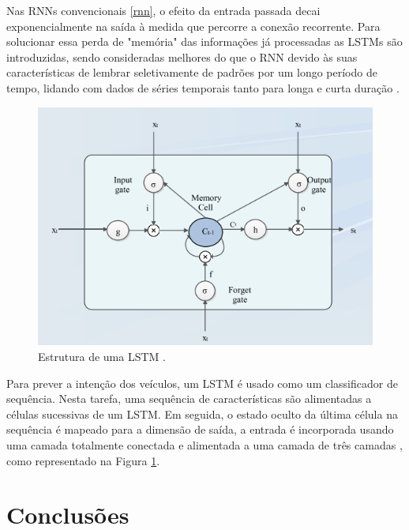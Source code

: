  \label{LSTM-s}

Nas RNNs convencionais \ref{rnn}, o efeito da entrada passada decai exponencialmente na saída à medida que percorre a conexão recorrente. Para solucionar essa perda de "memória" das informações já processadas as LSTMs são introduzidas, sendo consideradas melhores do que o RNN devido às suas características de lembrar seletivamente de padrões por um longo período de tempo, lidando com dados de séries temporais tanto para longa e curta duração \cite{software-cnn}.

\begin{figure}[H]
\centering
\includegraphics[width=\textwidth]{Figures/LSTM.png}
\caption{Estrutura de uma LSTM \cite{software-cnn}.}
\label{LSTM}
\end{figure}



Para prever a intenção dos veículos, um LSTM é usado como um classificador de sequência. Nesta tarefa, uma sequência de características são alimentadas a células sucessivas de um LSTM. Em seguida, o estado oculto da última célula na sequência é mapeado para a dimensão de saída, a entrada é incorporada usando uma camada totalmente conectada e alimentada a uma camada de três camadas \cite{software-review}, como representado na Figura \ref{LSTM}.




\chapter{Conclusões} \label{concl}

